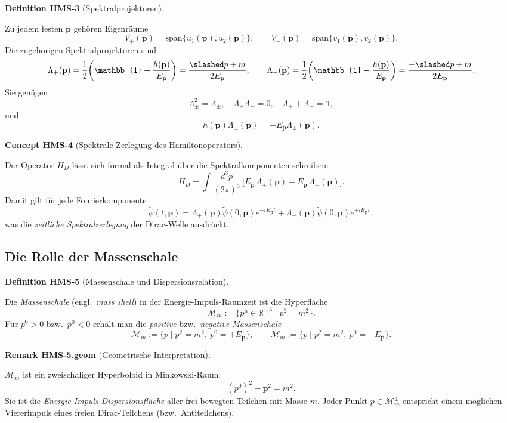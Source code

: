 \documentclass[10pt, letterpaper]{article}
\newcommand{\R}{\mathbb{R}}
\newcommand{\CustomHeading}[3]{%
  \par\medskip\noindent%
  \textbf{#1 #2} \textnormal{(#3)}.\enskip%
}
\newenvironment{DEF}[2]{\begin{unitbox}\CustomHeading{Definition}{#1}{#2}}{\end{unitbox}}
\newenvironment{REM}[2]{\begin{unitbox}\CustomHeading{Remark}{#1}{#2}}{\end{unitbox}}
\newenvironment{CONC}[2]{\begin{unitbox}\CustomHeading{Concept}{#1}{#2}}{\end{unitbox}}
\begin{document}
\begin{DEF}{HMS-3}{Spektralprojektoren}
Zu jedem festen $\mathbf p$ gehören Eigenräume
\[
V_+(\mathbf p)=\mathrm{span}\{u_1(\mathbf p),u_2(\mathbf p)\},\qquad
V_-(\mathbf p)=\mathrm{span}\{v_1(\mathbf p),v_2(\mathbf p)\}.
\]
Die zugehörigen Spektralprojektoren sind
\[
\Lambda_+(\mathbf p)=\frac{1}{2}\!\left(\mathbb{1}+\frac{h(\mathbf p)}{E_{\mathbf p}}\right)
=\frac{\slashed p+m}{2E_{\mathbf p}},\qquad
\Lambda_-(\mathbf p)=\frac{1}{2}\!\left(\mathbb{1}-\frac{h(\mathbf p)}{E_{\mathbf p}}\right)
=\frac{-\slashed p+m}{2E_{\mathbf p}}.
\]
Sie genügen
\[
 \Lambda_\pm^2=\Lambda_\pm,\quad
 \Lambda_+\Lambda_-=0,\quad
 \Lambda_++\Lambda_-=\mathbb{1},
\]
und
\[
 h(\mathbf p)\Lambda_\pm(\mathbf p)=\pm E_{\mathbf p}\Lambda_\pm(\mathbf p).
\]
\end{DEF}

\begin{CONC}{HMS-4}{Spektrale Zerlegung des Hamiltonoperators}
Der Operator $H_D$ lässt sich formal als Integral über die Spektralkomponenten schreiben:
\[
 H_D = \int\! \frac{d^3p}{(2\pi)^3}\,
 \big[ E_{\mathbf p}\,\Lambda_+(\mathbf p) - E_{\mathbf p}\,\Lambda_-(\mathbf p)\big].
\]
Damit gilt für jede Fourierkomponente
\[
 \tilde\psi(t,\mathbf p)=
 \Lambda_+(\mathbf p)\tilde\psi(0,\mathbf p)e^{-iE_{\mathbf p}t}
 +\Lambda_-(\mathbf p)\tilde\psi(0,\mathbf p)e^{+iE_{\mathbf p}t},
\]
was die \emph{zeitliche Spektralzerlegung} der Dirac-Welle ausdrückt.
\end{CONC}

\subsection{Die Rolle der Massenschale}

\begin{DEF}{HMS-5}{Massenschale und Dispersionsrelation}
Die \emph{Massenschale} (engl.\ \emph{mass shell}) in der Energie-Impuls-Raumzeit ist die Hyperfläche
\[
 \mathcal M_m:=\{p^\mu\in\R^{1,3}\mid p^2=m^2\}.
\]
Für $p^0>0$ bzw.\ $p^0<0$ erhält man die \emph{positive} bzw.\ \emph{negative Massenschale}
\[
 \mathcal M_m^+:=\{p\mid p^2=m^2,\ p^0=+E_{\mathbf p}\},\qquad
 \mathcal M_m^-:=\{p\mid p^2=m^2,\ p^0=-E_{\mathbf p}\}.
\]
\end{DEF}

\begin{REM}{HMS-5.geom}{Geometrische Interpretation}
$\mathcal M_m$ ist ein zweischaliger Hyperboloid in Minkowski-Raum:
\[
 (p^0)^2-\mathbf p^2=m^2.
\]
Sie ist die \emph{Energie-Impuls-Dispersionsfläche} aller frei bewegten Teilchen mit Masse $m$. Jeder Punkt $p\in\mathcal M_m^\pm$ entspricht einem möglichen Viererimpuls eines freien Dirac-Teilchens (bzw.\ Antiteilchens).
\end{REM}
\end{document}
